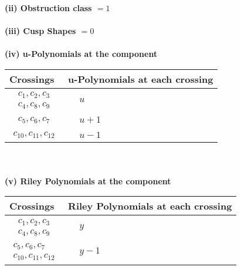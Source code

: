 \documentclass[1p]{elsarticle_modified}
\theoremstyle{definition}
\begin{document}
\flushleft \textbf{(ii) Obstruction class $= 1$}\\~\\
\flushleft \textbf{(iii) Cusp Shapes $= 0$}\\~\\
\newpage\renewcommand{\arraystretch}{1}
\flushleft \textbf{(iv) u-Polynomials at the component}\newline \\
\begin{tabular}{m{50pt}|m{274pt}}
Crossings & \hspace{64pt}u-Polynomials at each crossing \\
\hline $$\begin{aligned}c_{1},c_{2},c_{3}\\c_{4},c_{8},c_{9}\end{aligned}$$&$\begin{aligned}
&u
\end{aligned}$\\
\hline $$\begin{aligned}c_{5},c_{6},c_{7}\end{aligned}$$&$\begin{aligned}
&u+1
\end{aligned}$\\
\hline $$\begin{aligned}c_{10},c_{11},c_{12}\end{aligned}$$&$\begin{aligned}
&u-1
\end{aligned}$\\
\hline
\end{tabular}\\~\\
\newpage\renewcommand{\arraystretch}{1}
\flushleft \textbf{(v) Riley Polynomials at the component}\newline \\
\begin{tabular}{m{50pt}|m{274pt}}
Crossings & \hspace{64pt}Riley Polynomials at each crossing \\
\hline $$\begin{aligned}c_{1},c_{2},c_{3}\\c_{4},c_{8},c_{9}\end{aligned}$$&$\begin{aligned}
&y
\end{aligned}$\\
\hline $$\begin{aligned}c_{5},c_{6},c_{7}\\c_{10},c_{11},c_{12}\end{aligned}$$&$\begin{aligned}
&y-1
\end{aligned}$\\
\hline
\end{tabular}\\~\\
\end{document}
